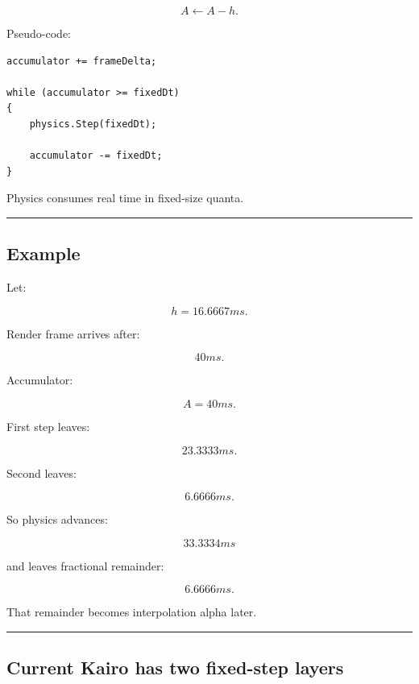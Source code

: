 \[
A\leftarrow A-h.
\]

Pseudo-code:

\begin{verbatim}
accumulator += frameDelta;

while (accumulator >= fixedDt)
{
    physics.Step(fixedDt);

    accumulator -= fixedDt;
}
\end{verbatim}

Physics consumes real time in fixed-size quanta.

\begin{center}\rule{0.5\linewidth}{0.5pt}\end{center}

\begin{allmightroleexample}

\subsection{Example}\label{06-engine-ii-ch037-example}

Let:

\end{allmightroleexample}

\[
h=16.6667ms.
\]

Render frame arrives after:

\[
40ms.
\]

Accumulator:

\[
A=40ms.
\]

First step leaves:

\[
23.3333ms.
\]

Second leaves:

\[
6.6666ms.
\]

So physics advances:

\[
33.3334ms
\]

and leaves fractional remainder:

\[
6.6666ms.
\]

That remainder becomes interpolation alpha later.

\begin{center}\rule{0.5\linewidth}{0.5pt}\end{center}

\subsection{Current Kairo has two fixed-step layers}\label{06-engine-ii-ch037-current-kairo-has-two-fixed-step-layers}

